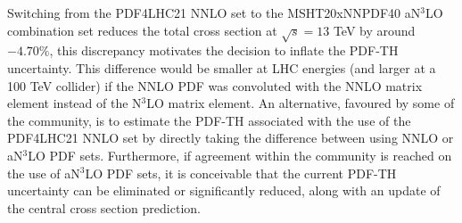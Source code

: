 \begin{itemize}
Switching from the PDF4LHC21 NNLO set to the MSHT20xNNPDF40 aN$^3$LO combination set reduces the total cross section at $\sqrt{s}=13$ TeV by around $-4.70\%$, this discrepancy motivates the decision to inflate the PDF-TH uncertainty.
This difference would be smaller at LHC energies (and larger at a 100 TeV collider) if the NNLO PDF was convoluted with the NNLO matrix element instead of the N$^3$LO matrix element.
An alternative, favoured by some of the community, is to estimate the PDF-TH associated with the use of the PDF4LHC21 NNLO set by directly taking the difference between using NNLO or aN$^3$LO PDF sets.
Furthermore, if agreement within the community is reached on the use of aN$^3$LO PDF sets, it is conceivable that the current PDF-TH uncertainty can be eliminated or significantly reduced, along with an update of the central cross section prediction.
\end{itemize}

